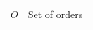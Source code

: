 %
%
%

\begin{center}
\begin{tabular}{@{}p{3.5cm}p{10cm}@{}}
$O$ & Set of orders \\
\end{tabular}
\end{center}
